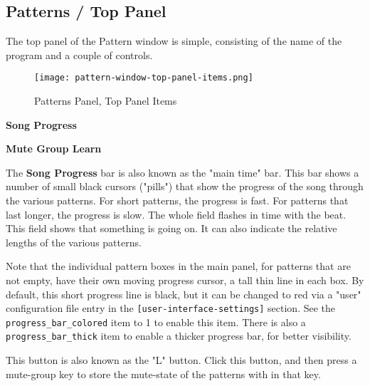\subsection{Patterns / Top Panel}
\label{subsec:seq64_patterns_panel_top}

   The top panel of the Pattern window is simple, consisting of the name of
   the program and a couple of controls.

\begin{figure}[H]
   \centering 
   \texttt{[image: pattern-window-top-panel-items.png]}
   \caption{Patterns Panel, Top Panel Items}
   \label{fig:pattern_window_top_panel_items}
\end{figure}

   \begin{enumber}
      \item \textbf{Song Progress}
      \item \textbf{Mute Group Learn}
   \end{enumber}

   \setcounter{ItemCounter}{0}      %

   The \textbf{Song Progress} bar is also known as the "main time" bar.
   This bar shows a number of small black cursors ("pills") that show the
   progress of the song through the various patterns.  For short patterns,
   the progress is fast.  For patterns that last longer, the progress is
   slow.  The whole field flashes in time with the beat.
   This field shows that something is going on.  It can also indicate
   the relative lengths of the various patterns.
 
   Note that the individual pattern boxes in the main panel, for
   patterns that are not empty, have their own
   moving progress cursor, a tall thin line in each box.
   By default, this short progress line is black, but it can be changed to
   red via a "user" configuration file entry in the 
   \texttt{[user-interface-settings]} section.
   See the \texttt{progress\_bar\_colored} item to 1 to enable this item.
   There is also a \texttt{progress\_bar\_thick} item to enable a thicker
   progress bar, for better visibility.


   This button is also known as the "L" button.
   Click this button, and then press a mute-group key
   to store the mute-state of the patterns with in that key.

